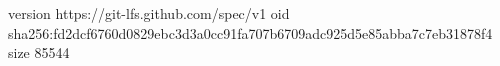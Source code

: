 version https://git-lfs.github.com/spec/v1
oid sha256:fd2dcf6760d0829ebc3d3a0cc91fa707b6709adc925d5e85abba7c7eb31878f4
size 85544
